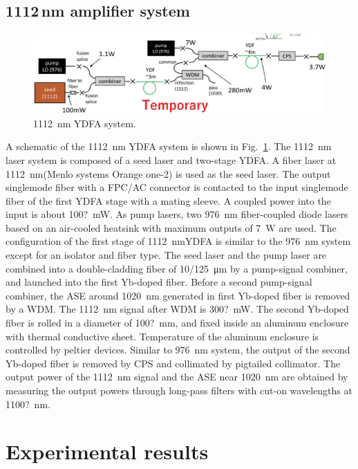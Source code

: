 \documentclass{osa-article}
\begin{document}
\subsection{1112\,nm amplifier system}

\begin{figure}[h!]
  \centering\includegraphics[width=\linewidth]{./Figure/1112nmYDFASystem_Temp.eps}
  \caption{\SI{1112}{\nm} YDFA system.}
  \label{fig:1112YDFASystem}
\end{figure}

A schematic of the \SI{1112}{\nm} YDFA system is shown in Fig.~\ref{fig:1112YDFASystem}.
The \SI{1112}{\nm} laser system is composed of a seed laser and two-stage YDFA.
A fiber laser at \SI{1112}{\nm}(Menlo systems Orange one-2) is used as the seed laser.
The output singlemode fiber with a FPC/AC connector is contacted to the input singlemode fiber of the first YDFA stage with a mating sleeve.
A coupled power into the input is about \SI{100?}{\mW}.
As pump lasers, two \SI{976}{\nm} fiber-coupled diode lasers based on an air-cooled heatsink with maximum outputs of \SI{7}{\W} are used.
The configuration of the first stage of \SI{1112}{\nm}YDFA is similar to the \SI{976}{\nm} system except for an isolator and fiber type.
The seed laser and the pump laser are combined into a double-cladding fiber of \SI{10/125}{\um} by a pump-signal combiner, and launched into the first Yb-doped fiber.
Before a second pump-signal combiner, the ASE around \SI{1020}{\nm} generated in first Yb-doped fiber is removed by a WDM.
The \SI{1112}{\nm} signal after WDM is \SI{300?}{\mW}.
The second Yb-doped fiber is rolled in a diameter of \SI{100?}{\mm}, and fixed inside an aluminum enclosure with thermal conductive sheet.
Temperature of the aluminum enclosure is controlled by peltier devices.
Similar to \SI{976}{\nm} system, the output of the second Yb-doped fiber is removed by CPS and collimated by pigtailed collimator.
The output power of the \SI{1112}{\nm} signal and the ASE near \SI{1020}{\nm} are obtained by measuring the output powers through long-pass filters with cut-on wavelengths at \SI{1100?}{\nm}.

\section{Experimental results}
\end{document}
